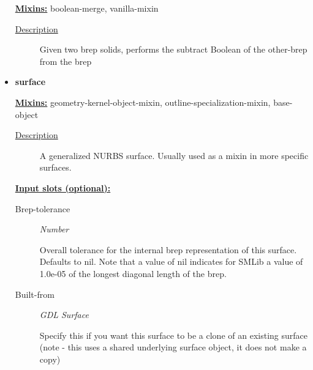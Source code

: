 \documentclass [11pt]{book}
\begin{document}
\begin{itemize}
\textbf{
\underline{Mixins:}} boolean-merge, vanilla-mixin





\begin{description}

\item [
\underline{Description}]


Given two brep solids, performs the subtract Boolean of the other-brep from the brep



\end{description}









\item {}
\label{prim:surface}
\textbf{surface}


\textbf{
\underline{Mixins:}} geometry-kernel-object-mixin, outline-specialization-mixin, base-object





\begin{description}

\item [
\underline{Description}]


A generalized NURBS surface. 
Usually used as a mixin in more specific surfaces.



\end{description}








\textbf{
\underline{Input slots (optional):}}

\begin{description}

\item [Brep-tolerance]
\emph{Number}

 Overall tolerance for the internal brep representation of this surface.
Defaults to nil. Note that a value of nil indicates for SMLib a value of 1.0e-05 of
the longest diagonal length of the brep.




\item [Built-from]
\emph{GDL Surface}

 Specify this if you want this surface to be a
clone of an existing surface (note - this uses a shared underlying
surface object, it does not make a copy)





\end{description}
\end{itemize}
\end{document}
